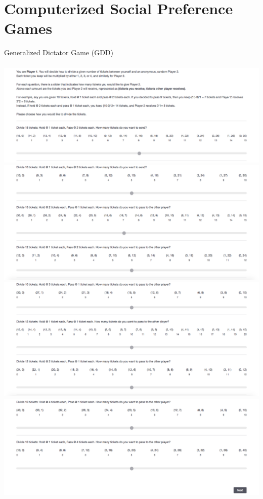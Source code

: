 \documentclass[12pt]{article}
\begin{document}
\section{Computerized Social Preference Games} \label{app:a} 
\vspace{8mm} 
\noindent Generalized Dictator Game (GDD) \\ \\
\includegraphics[scale=0.35]{gendict1}\\
\includegraphics[scale=0.35]{gendict2}\\
\includegraphics[scale=0.35]{gendict3}\\
\includegraphics[scale=0.35]{gendict4}\\ \\
\end{document}
